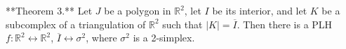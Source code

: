 **Theorem 3.** Let $J$ be a polygon in $\mathbb{R}^2$, let $I$ be its interior, and let $K$ be a subcomplex of a triangulation of $\mathbb{R}^2$ such that $|K| = \overline{I}$. Then there is a PLH $f: \mathbb{R}^2 \leftrightarrow \mathbb{R}^2$, $\overline{I} \leftrightarrow \sigma^2$, where $\sigma^2$ is a 2-simplex.
